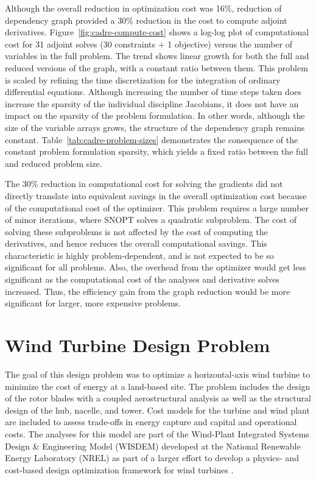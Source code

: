 \documentclass[]{aiaa-tc} %
\begin{document}
            Although the overall reduction in optimization cost was 16\%, reduction of dependency graph provided
            a 30\% reduction in the cost to compute adjoint derivatives.
            Figure~\ref{fig:cadre-compute-cost} shows a log-log plot of computational cost for 31 adjoint solves (30 constraints + 1 objective) versus the
            number of variables in the full problem. The trend shows linear growth for both the full and reduced
            versions of the graph, with a constant ratio between them. This problem is scaled by
            refining the time discretization for the integration of ordinary differential equations. Although
            increasing the number of time steps taken does increase the sparsity of the individual discipline Jacobians,
            it does not have an impact on the sparsity of the problem formulation. In other words, although the size of the
            variable arrays grows, the structure of the dependency graph remains constant. Table~\ref{tab:cadre-problem-sizes}
            demonstrates the consequence of the constant problem formulation sparsity, which yields a fixed ratio between
            the full and reduced problem size.

            The 30\% reduction in computational cost for solving the gradients did not directly translate into
            equivalent savings in the overall optimization cost because of the computational cost of the optimizer. This problem requires a large number of minor iterations, where SNOPT solves a quadratic subproblem.
            The cost of solving these subproblems is not affected by the cost of computing the derivatives, and hence
            reduces the overall computational savings. This characteristic is highly problem-dependent, and is not expected
            to be so significant for all problems. Also, the overhead from the optimizer would get less significant as the
            computational cost of the analyses and derivative solves increased. Thus, the efficiency gain from the graph reduction
            would be more significant for larger, more expensive problems.


  \section{Wind Turbine Design Problem}

    The goal of this design problem was to optimize a horizontal-axis wind turbine to minimize
    the cost of energy at a land-based site. The problem includes the design of the rotor blades
    with a coupled aerostructural analysis as well as the structural design of the hub, nacelle,
    and tower. Cost models for the turbine and wind plant are included
    to assess trade-offs in energy capture and capital and operational costs. The analyses
    for this model are part of the Wind-Plant Integrated Systems Design \& Engineering Model (WISDEM)
    developed at the National Renewable Energy Laboratory (NREL) as part of a larger effort
    to develop a physics- and cost-based design optimization framework for wind turbines  \cite{Dykes2014a,Ning2013a,Ning2014,Ning2014d}.
\end{document}

